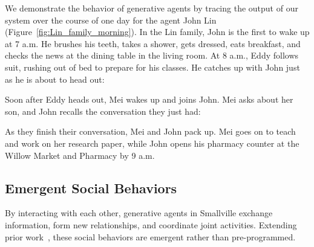 We demonstrate the behavior of generative agents by tracing the output of our system over the course of one day for the agent John Lin (Figure~\ref{fig:Lin_family_morning}). In the Lin family, John is the first to wake up at 7 a.m. He brushes his teeth, takes a shower, gets dressed, eats breakfast, and checks the news at the dining table in the living room. At 8 a.m., Eddy follows suit, rushing out of bed to prepare for his classes. He catches up with John just as he is about to head out:
\begin{quote}
\end{quote}
Soon after Eddy heads out, Mei wakes up and joins John. Mei asks about her son, and John recalls the conversation they just had:
\begin{quote}
\end{quote}
As they finish their conversation, Mei and John pack up. Mei goes on to teach and work on her research paper, while John opens his pharmacy counter at the Willow Market and Pharmacy by 9 a.m. 



\subsection{Emergent Social Behaviors}
By interacting with each other, generative agents in Smallville exchange information, form new relationships, and coordinate joint activities. Extending prior work~\cite{9_park2022socialsimulacra}, these social behaviors are emergent rather than pre-programmed. 


